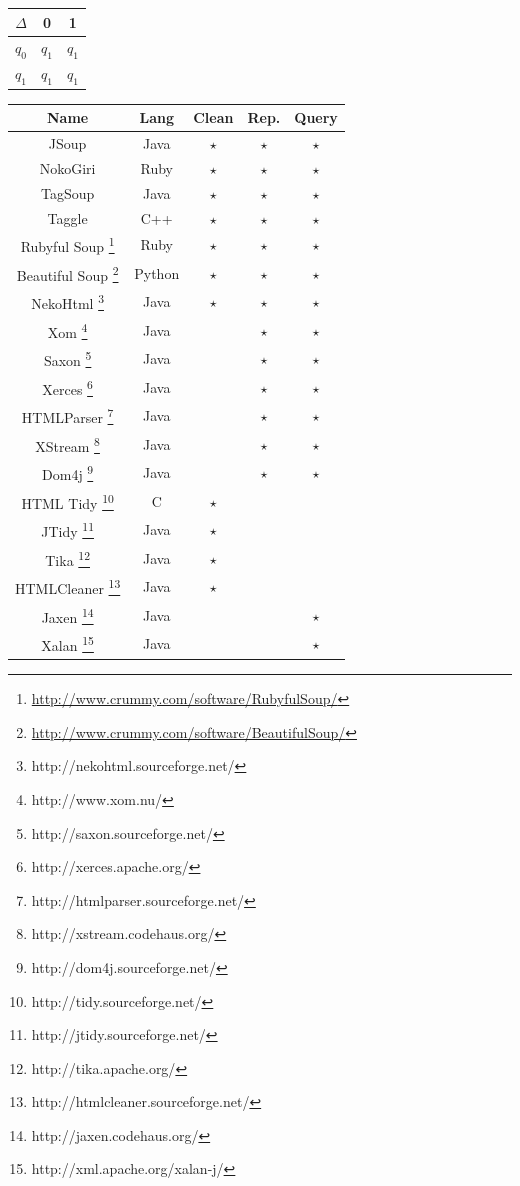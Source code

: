 \documentclass[12pt,letterpaper]{article}
\begin{document}
\begin{center}


\begin{tabular}{c|cc}
		$\Delta$ & 0 & 1\\
		\hline
		$q_0$ & $q_1$ & $q_1$\\ 
		\hline
		$q_1$ & $q_1$ & $q_1$\\ 
\end{tabular}

\end{center}





\begin{center}
\begin{tabular}{c|c|c|c|c}
Name & Lang & Clean & Rep. & Query\\
\hline
JSoup & Java & $\star$ & $\star$ & $\star$\\
\hline
NokoGiri & Ruby & $\star$ & $\star$ & $\star$\\
\hline
TagSoup & Java & $\star$ & $\star$ & $\star$\\
\hline
Taggle & C++ & $\star$ & $\star$ & $\star$\\
\hline
Rubyful Soup
\footnote{\url{http://www.crummy.com/software/RubyfulSoup/}} & Ruby
&$\star$ & $\star$ & $\star$\\
\hline
Beautiful Soup \footnote{\url{http://www.crummy.com/software/BeautifulSoup/}}
&Python&$\star$ & $\star$ & $\star$\\
\hline
NekoHtml \footnote{http://nekohtml.sourceforge.net/}  & Java & $\star$ & $\star$&$\star$\\
\hline
Xom  \footnote{http://www.xom.nu/} & Java & & $\star$ & $\star$\\
\hline
Saxon \footnote{http://saxon.sourceforge.net/} & Java & & $\star$ &$\star$\\
\hline
Xerces \footnote{http://xerces.apache.org/}& Java & & $\star$ &$\star$\\
\hline
HTMLParser \footnote{http://htmlparser.sourceforge.net/} & Java & & $\star$&$\star$\\
\hline
XStream \footnote{http://xstream.codehaus.org/} & Java & & $\star$&$\star$\\
\hline
Dom4j \footnote{http://dom4j.sourceforge.net/} & Java & & $\star$ & $\star$\\
\hline
HTML Tidy \footnote{http://tidy.sourceforge.net/} & C & $\star$ & &\\
\hline
JTidy \footnote{http://jtidy.sourceforge.net/} & Java & $\star$ & &\\
\hline
Tika \footnote{http://tika.apache.org/} & Java & $\star$ & &\\
\hline
HTMLCleaner \footnote{http://htmlcleaner.sourceforge.net/} & Java & $\star$ & &\\
\hline
Jaxen \footnote{http://jaxen.codehaus.org/} & Java & & &$\star$\\
\hline
Xalan \footnote{http://xml.apache.org/xalan-j/} & Java & & &$\star$\\
\hline

\end{tabular}
\end{center}
\end{document}
